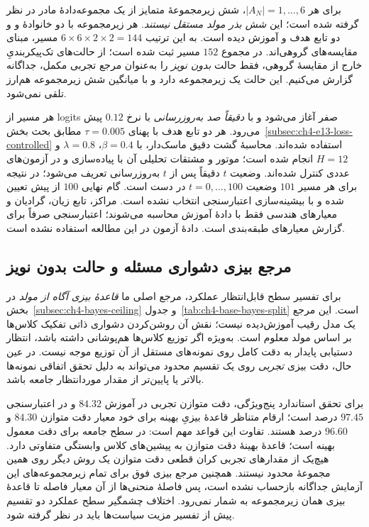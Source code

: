 برای هر $|A_N|=1,\ldots,6$،
شش زیرمجموعهٔ متمایز از یک مجموعه‌دادهٔ مادر
در نظر گرفته شده است؛ این
\emph{شش بذر مولد مستقل نیستند}.
هر زیرمجموعه با دو خانوادهٔ
 و 
و دو تابع هدف
 و 
آموزش دیده است. به این ترتیب
$6\times6\times2\times2=144$
مسیر، مبنای مقایسه‌های گروهی‌اند.
در مجموع $152$ مسیر ثبت شده است؛
از حالت‌های تک‌پیکربندیِ خارج از
مقایسهٔ گروهی، فقط حالت
\emph{بدون نویز} را به‌عنوان
مرجع تجربی مکمل، جداگانه گزارش می‌کنیم.
این حالت یک زیرمجموعه دارد
و با میانگین شش زیرمجموعه هم‌ارز
تلقی نمی‌شود.

هر مسیر از logits صفر آغاز می‌شود و
با \emph{دقیقاً صد به‌روزرسانی}
 با نرخ $0.12$
پیش می‌رود. هر دو تابع هدف
با پهنای $\tau=0.005$ مطابق
بحث بخش~\ref{subsec:ch4-e13-loss-controlled}
استفاده شده‌اند.
محاسبهٔ گشت دقیق ماسک‌دار،
با $\beta=0.4$، $\lambda=0.8$
و $H=12$ انجام شده است؛
موتور و مشتقات تحلیلی آن با
 پیاده‌سازی و
در آزمون‌های عددی کنترل شده‌اند.
وضعیت $t$ دقیقاً پس از
$t$ به‌روزرسانی تعریف می‌شود؛
در نتیجه برای هر مسیر $101$
وضعیت $t=0,\ldots,100$ در دست است.
گام نهایی $100$ از پیش تعیین شده
و با بیشینه‌سازی اعتبارسنجی انتخاب نشده است.
مراکز، تابع زیان، گرادیان و
معیارهای هندسی فقط با دادهٔ آموزش
محاسبه می‌شوند؛ اعتبارسنجی
صرفاً برای گزارش معیارهای طبقه‌بندی است.
دادهٔ آزمون در این مطالعه استفاده نشده است.

\subsection{مرجع بیزی دشواری مسئله و حالت بدون نویز}
\label{subsec:ch4-e14-reference}

برای تفسیر سطح قابل‌انتظار عملکرد،
مرجع اصلی ما
\emph{قاعدهٔ بیزی آگاه از مولد}
در بخش~\ref{subsec:ch4-bayes-ceiling}
و جدول~\ref{tab:ch4-base-bayes-split} است.
این مرجع یک مدل رقیب آموزش‌دیده نیست؛
نقش آن روشن‌کردن دشواری ذاتی
تفکیک کلاس‌ها بر اساس مولد معلوم است.
به‌ویژه اگر توزیع کلاس‌ها هم‌پوشانی داشته باشد،
انتظار دستیابی پایدار به دقت کامل
روی نمونه‌های مستقل از آن توزیع
موجه نیست. در عین حال،
دقت بیزی \emph{تجربی} روی
یک تقسیم محدود می‌تواند به دلیل
تحقق اتفاقی نمونه‌ها بالاتر یا پایین‌تر
از مقدار موردانتظار جامعه باشد.

برای تحقق استاندارد پنج‌ویژگی،
دقت متوازن تجربی 
در آموزش $84.32$ و در اعتبارسنجی
$97.45$ درصد است؛
ارقام متناظر قاعدهٔ بیزیِ
بهینه برای خود معیار دقت متوازن
$84.30$ و $96.60$ درصد هستند.
تفاوت این قواعد مهم است:
 در سطح جامعه برای
دقت معمول بهینه است؛
قاعدهٔ بهینهٔ دقت متوازن
به پیشین‌های کلاس وابستگی متفاوتی دارد.
هیچ‌یک از مقدارهای تجربی
کران قطعی دقت متوازن یک روش دیگر
روی همین مجموعهٔ محدود نیستند.
همچنین مرجع بیزی فوق
برای تمام زیرمجموعه‌های این آزمایش
جداگانه بازحساب نشده است،
پس فاصلهٔ منحنی‌ها از آن
معیار فاصله تا قاعدهٔ بیزی
همان زیرمجموعه به شمار نمی‌رود.
اختلاف چشمگیر سطح عملکرد دو تقسیم
پیش از تفسیر مزیت سیاست‌ها
باید در نظر گرفته شود.

